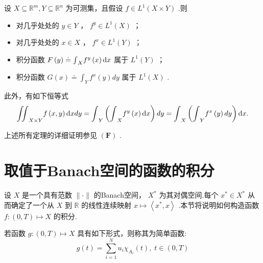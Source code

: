 \begin{theorem}[Fubini]\label{thm:app-A-13}
设 $X \subseteq  {\mathbb{R}}^{m},Y \subseteq  {\mathbb{R}}^{n}$ 为可测集，且假设 $f \in  {L}^{1}\left( {X \times  Y}\right)$ .则

\begin{itemize}\relax
\item\relax 对几乎处处的 $y \in  Y$ ， ${f}^{y} \in  {L}^{1}\left( X\right)$ ；
\end{itemize}

\begin{itemize}\relax
\item\relax 对几乎处处的 $x \in  X$ ， ${f}^{x} \in  {L}^{1}\left( Y\right)$ ；
\end{itemize}

\begin{itemize}\relax
\item\relax 积分函数 $F\left( y\right)  \doteq  {\int }_{X}{f}^{y}\left( x\right) {\mathop{}\!\mathrm{d} x}$ 属于 ${L}^{1}\left( Y\right)$ ；
\end{itemize}

\begin{itemize}\relax
\item\relax 积分函数 $G\left( x\right)  \doteq  {\int }_{Y}{f}^{x}\left( y\right) {dy}$ 属于 ${L}^{1}\left( X\right)$ .
\end{itemize}

此外，有如下恒等式
\[
{\iint }_{X \times  Y}f\left( {x,y}\right) {\mathop{}\!\mathrm{d} xdy} = {\int }_{Y}\left(  {{\int }_{X}{f}^{y}\left( x\right) {\mathop{}\!\mathrm{d} x}}\right)  {dy} = {\int }_{X}\left(  {{\int }_{Y}{f}^{x}\left( y\right) {dy}}\right)  {\mathop{}\!\mathrm{d} x}.
\]
\end{theorem}

上述所有定理的详细证明参见 $\left(  \bm{F}\right)$ .

\section{取值于Banach空间的函数的积分}

设 $X$ 是一个具有范数 $\|  \cdot  \|$ 的Banach空间， ${X}^{ * }$ 为其对偶空间.每个 ${x}^{ * } \in  {X}^{ * }$ 从而确定了一个从 $X$ 到 $\mathbb{R}$ 的线性连续映射 $x \mapsto  \left\langle  {{x}^{ * },x}\right\rangle$ .本节将说明如何构造函数 $f : \left(  {0,T}\right)   \mapsto  X$ 的积分.

若函数 $g : \left(  {0,T}\right)   \mapsto  X$ 具有如下形式，则称其为简单函数:
\begin{equation}\tag{A.11}\label{eq:app-A-11}
g\left( t\right)  = \sum_{{i = 1}}^{N}{u}_{i}{\chi }_{{A}_{i}}\left( t\right) ,\;t \in  \left(  {0,T}\right)
\end{equation}

